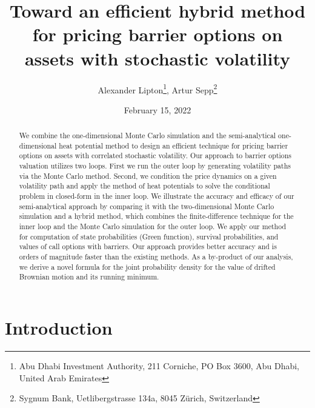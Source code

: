 \documentclass{article}
\begin{document}
\title{Toward an efficient hybrid method for pricing barrier options on
assets with stochastic volatility }
\author{Alexander Lipton\thanks{%
Abu Dhabi Investment Authority, 211 Corniche, PO Box 3600, Abu Dhabi, United
Arab Emirates}, Artur Sepp\thanks{%
Sygnum Bank, Uetlibergstrasse 134a, 8045 Z\"{u}rich, Switzerland}}
\date{February 15, 2022}
\maketitle

\begin{abstract}
We combine the one-dimensional Monte Carlo simulation and the
semi-analytical one-dimensional heat potential method to design an efficient
technique for pricing barrier options on assets with correlated stochastic
volatility. Our approach to barrier options valuation utilizes two loops.
First we run the outer loop by generating volatility paths via the Monte
Carlo method. Second, we condition the price dynamics on a given volatility
path and apply the method of heat potentials to solve the conditional
problem in closed-form in the inner loop. We illustrate the accuracy and
efficacy of our semi-analytical approach by comparing it with the
two-dimensional Monte Carlo simulation and a hybrid method, which combines
the finite-difference technique for the inner loop and the Monte Carlo
simulation for the outer loop. We apply our method for computation of state
probabilities (Green function), survival probabilities, and values of call
options with barriers. Our approach provides better accuracy and is orders
of magnitude faster than the existing methods. As a by-product of our
analysis, we derive a novel formula for the joint probability density for
the value of drifted Brownian motion and its running minimum.
\end{abstract}

\section{Introduction\label{Sec1}}
\end{document}
